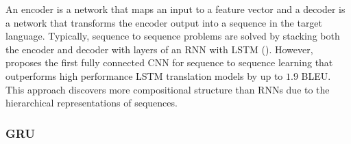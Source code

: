 
% 




An encoder is a network that maps an input to a feature vector and a decoder is a network that transforms the encoder output into a sequence in the target language. Typically, sequence to sequence problems are solved by stacking both the encoder and decoder with layers of an RNN with \acrshort{LSTM} (\cite{luong_effective_2015}). However, \cite{gehring_convolutional_2017} proposes the first fully connected \acrshort{CNN} for sequence to sequence learning that outperforms high performance \acrshort{LSTM} translation models by up to $1.9$ \acrshort{BLEU}. This approach discovers more compositional structure than \acrshort{RNN}s due to the hierarchical representations of sequences.

\subsubsection{\acrlong{GRU}}



